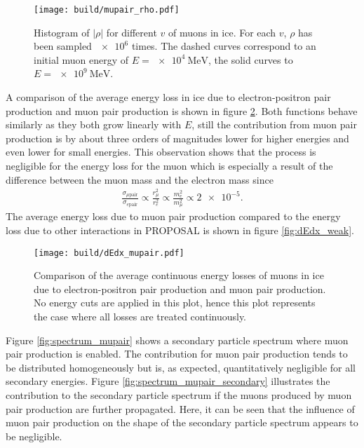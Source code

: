 \begin{figure}
    \centering
    \texttt{[image: build/mupair\_rho.pdf]}
    \caption{Histogram of $\lvert\rho\rvert$ for different $v$ of muons in ice. For each $v$, $\rho$ has been sampled $\num{e6}$ times. The dashed curves correspond to an initial muon energy of $E=\SI{e4}{\mega\electronvolt}$, the solid curves to $E = \SI{e9}{\mega\electronvolt}$.}
    \label{fig:rho_mupair}
\end{figure}

A comparison of the average energy loss in ice due to electron-positron pair production and muon pair production is shown in figure \ref{fig:dEdx_mupair}.
Both functions behave similarly as they both grow linearly with $E$, still the contribution from muon pair production is by about three orders of magnitudes lower for higher energies and even lower for small energies.
This observation shows that the process is negligible for the energy loss for the muon which is especially a result of the difference between the muon mass and the electron mass since 
\begin{align*}
	\frac{\sigma_{\mu \text{pair}}}{\sigma_{e \text{pair}}} \propto \frac{r_{\mu}^2}{r_e^2} \propto \frac{m_e^2}{m_{\mu}^2} \propto \num{2e-5}.
\end{align*}
The average energy loss due to muon pair production compared to the energy loss due to other interactions in PROPOSAL is shown in figure \ref{fig:dEdx_weak}.

\begin{figure}
    \centering
    \texttt{[image: build/dEdx\_mupair.pdf]}
    \caption{Comparison of the average continuous energy losses of muons in ice due to electron-positron pair production and muon pair production. No energy cuts are applied in this plot, hence this plot represents the case where all losses are treated continuously.}
    \label{fig:dEdx_mupair}
\end{figure}

Figure \ref{fig:spectrum_mupair} shows a secondary particle spectrum where muon pair production is enabled.
The contribution for muon pair production tends to be distributed homogeneously but is, as expected, quantitatively negligible for all secondary energies.
Figure \ref{fig:spectrum_mupair_secondary} illustrates the contribution to the secondary particle spectrum if the muons produced by muon pair production are further propagated.
Here, it can be seen that the influence of muon pair production on the shape of the secondary particle spectrum appears to be negligible. 

